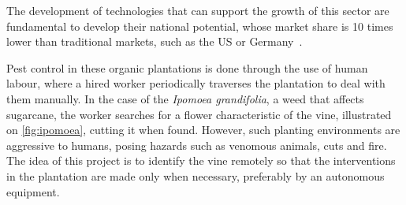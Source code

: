\documentclass[
    12pt,                       %
    oneside,                    %
    a4paper,                    %
    brazil,                     %
    french,                     %
    spanish,                    %
    english,                    %
    ]{abntex2}
\begin{document}
  The development of technologies that can support the growth of this sector are fundamental to develop their national potential, whose market share is 10 times lower than traditional markets, such as the US or Germany~\cite{organicos_carta_capital}.



  Pest control in these organic plantations is done through the use of human labour, where a hired worker periodically traverses the plantation to deal with them manually. In the case of the \textit{Ipomoea grandifolia}, a weed that affects sugarcane, the worker searches for a flower characteristic of the vine, illustrated on \autoref{fig:ipomoea}, cutting it when found. However, such planting environments are aggressive to humans, posing hazards such as venomous animals, cuts and fire. The idea of this project is to identify the vine remotely so that the interventions in the plantation are made only when necessary, preferably by an autonomous equipment.
\end{document}
